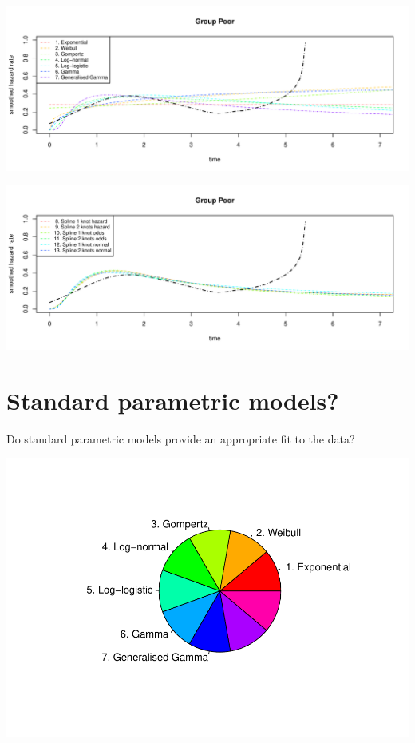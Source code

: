 \documentclass[]{article}
\begin{document}
\begin{flushleft}\includegraphics[height=0.29\textheight]{Images/plot_hr_pred-5} \end{flushleft}

\begin{flushleft}\includegraphics[height=0.29\textheight]{Images/plot_hr_pred-6} \end{flushleft}

\newpage

\section{Standard parametric models?}\label{standard-parametric-models}

Do standard parametric models provide an appropriate fit to the data?

\begin{flushleft}\includegraphics{Images/plot_parametric-1} \end{flushleft}
\end{document}
